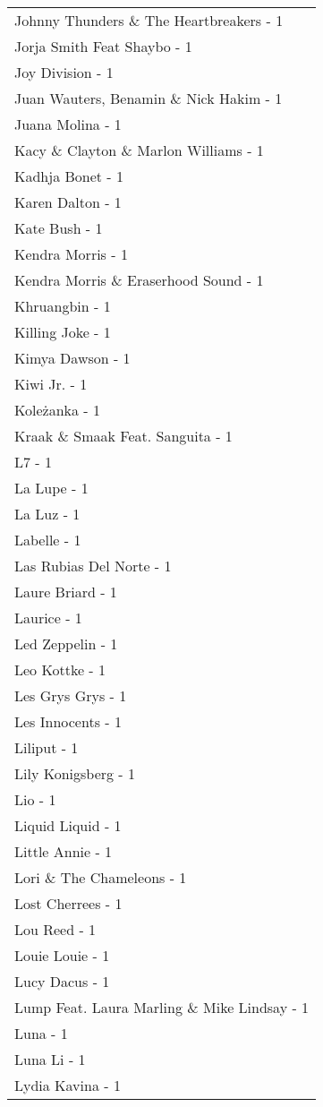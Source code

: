 \documentclass[
]{article}
\begin{document}
\begin{longtable}{l}
Johnny Thunders \& The Heartbreakers - 1 \\ 
Jorja Smith Feat Shaybo - 1 \\ 
Joy Division - 1 \\ 
Juan Wauters, Benamin \& Nick Hakim - 1 \\ 
Juana Molina - 1 \\ 
Kacy \& Clayton \& Marlon Williams - 1 \\ 
Kadhja Bonet - 1 \\ 
Karen Dalton - 1 \\ 
Kate Bush - 1 \\ 
Kendra Morris - 1 \\ 
Kendra Morris \& Eraserhood Sound - 1 \\ 
Khruangbin - 1 \\ 
Killing Joke - 1 \\ 
Kimya Dawson - 1 \\ 
Kiwi Jr. - 1 \\ 
Koleżanka - 1 \\ 
Kraak \& Smaak Feat. Sanguita - 1 \\ 
L7 - 1 \\ 
La Lupe - 1 \\ 
La Luz - 1 \\ 
Labelle - 1 \\ 
Las Rubias Del Norte - 1 \\ 
Laure Briard - 1 \\ 
Laurice - 1 \\ 
Led Zeppelin - 1 \\ 
Leo Kottke - 1 \\ 
Les Grys Grys - 1 \\ 
Les Innocents - 1 \\ 
Liliput - 1 \\ 
Lily Konigsberg - 1 \\ 
Lio - 1 \\ 
Liquid Liquid - 1 \\ 
Little Annie - 1 \\ 
Lori \& The Chameleons - 1 \\ 
Lost Cherrees - 1 \\ 
Lou Reed - 1 \\ 
Louie Louie - 1 \\ 
Lucy Dacus - 1 \\ 
Lump Feat. Laura Marling \& Mike Lindsay - 1 \\ 
Luna - 1 \\ 
Luna Li - 1 \\ 
Lydia Kavina - 1 \\ 

\end{longtable}
\end{document}
